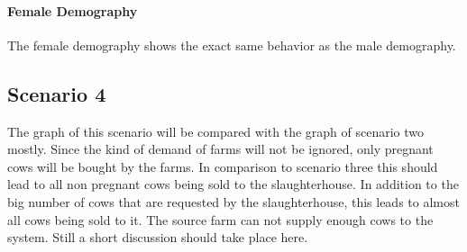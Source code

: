 \paragraph{Female Demography}
The female demography shows the exact same behavior as the male demography.

\subsection{Scenario 4}
The graph of this scenario will be compared with the graph of scenario two mostly. Since the kind of demand of farms will not be ignored, only pregnant cows will be bought by the farms. In comparison to scenario three this should lead to all non pregnant cows being sold to the slaughterhouse. In addition to the big number of cows that are requested by the slaughterhouse, this leads to almost all cows being sold to it. The source farm can not supply enough cows to the system. Still a short discussion should take place here.
